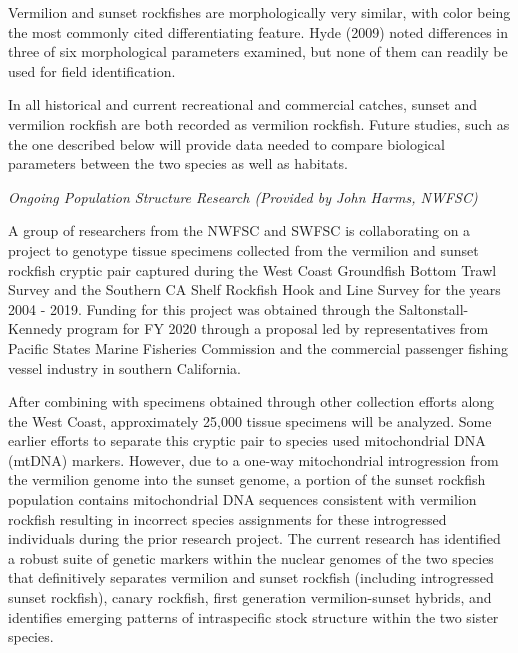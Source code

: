 \documentclass[11pt,
  english,
  a4paper,
]{article}
\begin{document}
Vermilion and sunset rockfishes are morphologically very similar, with color being the most commonly cited differentiating feature. Hyde {(2009)\leavevmode\tagmcend\tagstructend} noted differences in three of six morphological parameters examined, but none of them can readily be used for field identification.

In all historical and current recreational and commercial catches, sunset and vermilion rockfish are both recorded as vermilion rockfish. Future studies, such as the one described below will provide data needed to compare biological parameters between the two species as well as habitats.

\emph{Ongoing Population Structure Research (Provided by John Harms, NWFSC)}

A group of researchers from the NWFSC and SWFSC is collaborating on a project to genotype tissue specimens collected from the vermilion and sunset rockfish cryptic pair captured during the West Coast Groundfish Bottom Trawl Survey and the Southern CA Shelf Rockfish Hook and Line Survey for the years 2004 - 2019. Funding for this project was obtained through the Saltonstall-Kennedy program for FY 2020 through a proposal led by representatives from Pacific States Marine Fisheries Commission and the commercial passenger fishing vessel industry in southern California.

After combining with specimens obtained through other collection efforts along the West Coast, approximately 25,000 tissue specimens will be analyzed. Some earlier efforts to separate this cryptic pair to species used mitochondrial DNA (mtDNA) markers. However, due to a one-way mitochondrial introgression from the vermilion genome into the sunset genome, a portion of the sunset rockfish population contains mitochondrial DNA sequences consistent with vermilion rockfish resulting in incorrect species assignments for these introgressed individuals during the prior research project. The current research has identified a robust suite of genetic markers within the nuclear genomes of the two species that definitively separates vermilion and sunset rockfish (including introgressed sunset rockfish), canary rockfish, first generation vermilion-sunset hybrids, and identifies emerging patterns of intraspecific stock structure within the two sister species.
\end{document}
